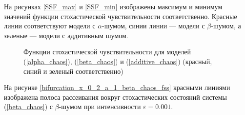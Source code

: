     На рисунках \ref{SSF_max} и \ref{SSF_min} изображены максимум и минимум значений функции стохастической чувствительности соответственно. Красные линии соответствуют модели с \(\alpha\)-шумом, синии линии --- модели с \(\beta\)-шумом, а зеленые --- модели с аддитивным шумом.

    \begin{figure}
        \centering
            
        \captionsetup{justification=centering}
        \caption{Функции стохастической чувствительности для моделей (\ref{alpha_chaos}), (\ref{beta_chaos}) и (\ref{additive_chaos}) (красный, синий и зеленый соответственно)}
    \end{figure}
  
    На рисунке \ref{bifurcation_x_0_2_a_1_beta_chaos_fss} красными линиями изображена полоса рассеивания вокруг стохастических состояний системы (\ref{beta_chaos}) с \(\beta\)-шумом при интенсивности \(\varepsilon = 0.001\). 

